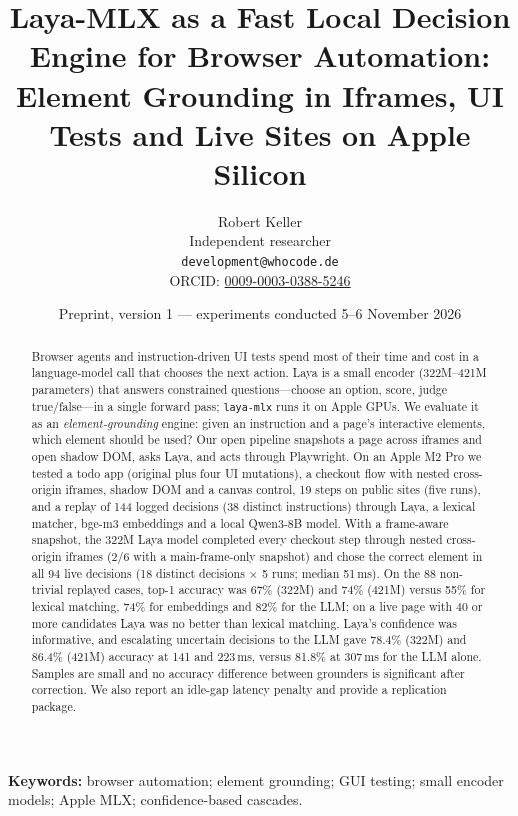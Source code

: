 \documentclass[11pt,a4paper]{article}
\title{\textbf{Laya-MLX as a Fast Local Decision Engine for Browser Automation:\\ Element Grounding in Iframes, UI Tests and Live Sites on Apple Silicon}}
\author{Robert Keller\\ \small Independent researcher\\ \small \texttt{development@whocode.de}\\ \small ORCID: \href{https://orcid.org/0009-0003-0388-5246}{0009-0003-0388-5246}}
\date{Preprint, version 1 --- experiments conducted 5--6 November 2026}
\begin{document}
\maketitle

\begin{abstract}\noindent
Browser agents and instruction-driven UI tests spend most of their time and cost in a language-model call that chooses the next action. Laya is a small encoder (322M--421M parameters) that answers constrained questions---choose an option, score, judge true/false---in a single forward pass; \texttt{laya-mlx} runs it on Apple GPUs. We evaluate it as an \emph{element-grounding} engine: given an instruction and a page's interactive elements, which element should be used? Our open pipeline snapshots a page across iframes and open shadow DOM, asks Laya, and acts through Playwright. On an Apple M2 Pro we tested a todo app (original plus four UI mutations), a checkout flow with nested cross-origin iframes, shadow DOM and a canvas control, 19 steps on public sites (five runs), and a replay of 144 logged decisions (38 distinct instructions) through Laya, a lexical matcher, bge-m3 embeddings and a local Qwen3-8B model. With a frame-aware snapshot, the 322M Laya model completed every checkout step through nested cross-origin iframes (2/6 with a main-frame-only snapshot) and chose the correct element in all 94 live decisions (18 distinct decisions $\times$ 5 runs; median 51\,ms). On the 88 non-trivial replayed cases, top-1 accuracy was 67\% (322M) and 74\% (421M) versus 55\% for lexical matching, 74\% for embeddings and 82\% for the LLM; on a live page with 40 or more candidates Laya was no better than lexical matching. Laya's confidence was informative, and escalating uncertain decisions to the LLM gave 78.4\% (322M) and 86.4\% (421M) accuracy at 141 and 223\,ms, versus 81.8\% at 307\,ms for the LLM alone. Samples are small and no accuracy difference between grounders is significant after correction. We also report an idle-gap latency penalty and provide a replication package.
\end{abstract}

\noindent\textbf{Keywords:} browser automation; element grounding; GUI testing; small encoder models; Apple MLX; confidence-based cascades.
\end{document}
